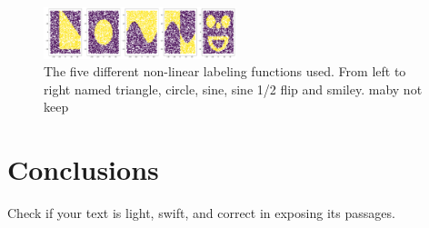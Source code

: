 \documentclass[prl,twocolumn]{revtex4-1}
\begin{document}
\begin{figure}[!tb]
  \includegraphics[width=0.50\textwidth]{task_1/figures/non_linear_functions.pdf}
  \caption{
  The five different non-linear labeling functions used. From left to right named triangle, circle, sine, sine 1/2 flip and smiley. \color{red} maby not keep \color{black}
  }
  \label{fig:rescale_box}
\end{figure}


\section{Conclusions}


Check if your text is light, swift, and correct in exposing its passages.
\end{document}
